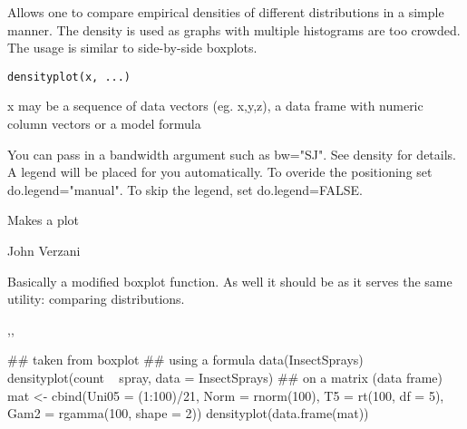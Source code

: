 \begin{Description}\relax
Allows one to compare empirical densities of different distributions
in a simple manner. The density is used as graphs with multiple
histograms are too crowded. The usage is similar to side-by-side boxplots.
\end{Description}
\begin{Usage}
\begin{verbatim}
densityplot(x, ...)
\end{verbatim}
\end{Usage}
\begin{Arguments}
\begin{ldescription}
\item[\code{x}] x may be a sequence of data vectors (eg. x,y,z), a data frame 
with numeric column vectors or a model formula
\item[\code{...}] You can pass in a bandwidth argument such as bw="SJ". See 
density for details. A legend will be placed for you automatically. To 
overide the positioning set do.legend="manual". To skip the legend,
set do.legend=FALSE. 
\end{ldescription}
\end{Arguments}
\begin{Value}
Makes a plot
\end{Value}
\begin{Author}\relax
John Verzani
\end{Author}
\begin{References}\relax
Basically a modified boxplot function. As well it should be 
as it serves the same utility: comparing distributions.
\end{References}
\begin{SeeAlso}\relax
{},,
\end{SeeAlso}
\begin{Examples}
\begin{ExampleCode}
## taken from boxplot
## using a formula
data(InsectSprays)
densityplot(count ~ spray, data = InsectSprays)
## on a matrix (data frame)
mat <- cbind(Uni05 = (1:100)/21, Norm = rnorm(100),
             T5 = rt(100, df = 5), Gam2 = rgamma(100, shape = 2))
densityplot(data.frame(mat))

\end{ExampleCode}
\end{Examples}

